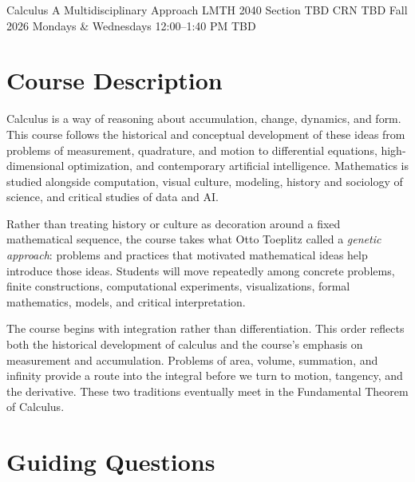 \documentclass[11pt]{article}
\newcommand{\CourseSection}{TBD}
\newcommand{\CourseCRN}{TBD}
\newcommand{\CourseRoom}{TBD}
\begin{document}
\courseheader
  {Calculus}
  {A Multidisciplinary Approach}
  {LMTH 2040 \textbullet{} Section \CourseSection{}
   \textbullet{} CRN \CourseCRN}
  {Fall 2026 \textbullet{} Mondays \& Wednesdays
   \textbullet{} 12:00--1:40 PM
   \textbullet{} \CourseRoom}


\section{Course Description}

Calculus is a way of reasoning about accumulation, change, dynamics,
and form. This course follows the historical and conceptual development
of these ideas from problems of measurement, quadrature, and motion to
differential equations, high-dimensional optimization, and contemporary
artificial intelligence. Mathematics is studied alongside computation,
visual culture, modeling, history and sociology of science, and critical
studies of data and AI.

Rather than treating history or culture as decoration around a fixed
mathematical sequence, the course takes what Otto Toeplitz called a
\emph{genetic approach}: problems and practices that motivated
mathematical ideas help introduce those ideas. Students will move
repeatedly among concrete problems, finite constructions, computational
experiments, visualizations, formal mathematics, models, and critical
interpretation.

The course begins with integration rather than differentiation. This
order reflects both the historical development of calculus and the
course's emphasis on measurement and accumulation. Problems of area,
volume, summation, and infinity provide a route into the integral before
we turn to motion, tangency, and the derivative. These two traditions
eventually meet in the Fundamental Theorem of Calculus.


\section{Guiding Questions}
\end{document}
